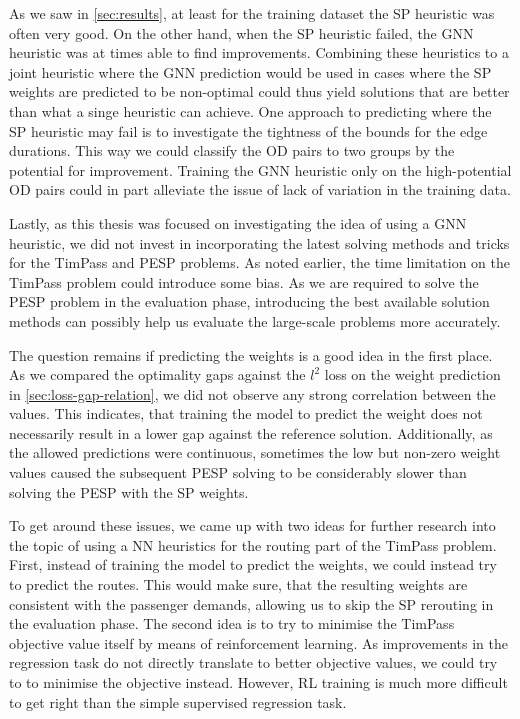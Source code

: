 \documentclass[english, 12pt, a4paper, sci, utf8, a-2b, online]{aaltothesis}
\begin{document}
As we saw in \cref{sec:results}, at least for the training dataset the SP heuristic was often very good. On the other hand, when the SP heuristic failed, the GNN heuristic was at times able to find improvements. Combining these heuristics to a joint heuristic where the GNN prediction would be used in cases where the SP weights are predicted to be non-optimal could thus yield solutions that are better than what a singe heuristic can achieve. One approach to predicting where the SP heuristic may fail is to investigate the tightness of the bounds for the edge durations. This way we could classify the OD pairs to two groups by the potential for improvement. Training the GNN heuristic only on the high-potential OD pairs could in part alleviate the issue of lack of variation in the training data.

Lastly, as this thesis was focused on investigating the idea of using a GNN heuristic, we did not invest in incorporating the latest solving methods and tricks for the TimPass and PESP problems. As noted earlier, the time limitation on the TimPass problem could introduce some bias. As we are required to solve the PESP problem in the evaluation phase, introducing the best available solution methods can possibly help us evaluate the large-scale problems more accurately.

The question remains if predicting the weights is a good idea in the first place. As we compared the optimality gaps against the $l^2$ loss on the weight prediction in \cref{sec:loss-gap-relation}, we did not observe any strong correlation between the values. This indicates, that training the model to predict the weight does not necessarily result in a lower gap against the reference solution. Additionally, as the allowed predictions were continuous, sometimes the low but non-zero weight values caused the subsequent PESP solving to be considerably slower than solving the PESP with the SP weights. %

To get around these issues, we came up with two ideas for further research into the topic of using a NN heuristics for the routing part of the TimPass problem. First, instead of training the model to predict the weights, we could instead try to predict the routes. This would make sure, that the resulting weights are consistent with the passenger demands, allowing us to skip the SP rerouting in the evaluation phase. The second idea is to try to minimise the TimPass objective value itself by means of reinforcement learning. As improvements in the regression task do not directly translate to better objective values, we could try to to minimise the objective instead. However, RL training is much more difficult to get right than the simple supervised regression task.
\end{document}
